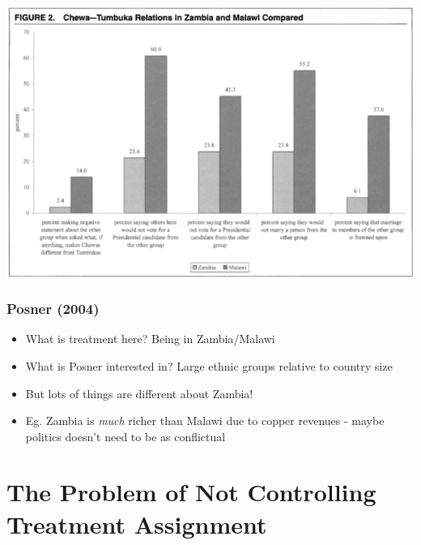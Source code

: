 \documentclass[xcolor=x11names,compress]{beamer}\usepackage[]{graphicx}\usepackage[]{color}
\renewcommand{\(}{\begin{columns}}
\renewcommand{\)}{\end{columns}}
\newcommand{\<}[1]{\begin{column}{#1}}
\renewcommand{\>}{\end{column}}
\begin{document}
\begin{frame}
\includegraphics[width=1\textwidth]{Posner_results.png}
\end{frame}

\begin{frame}
\frametitle{Posner (2004)}
\begin{itemize}
\item What is treatment here? \pause Being in Zambia/Malawi
\pause 
\item What is Posner interested in? \pause Large ethnic groups relative to country size
\pause
\item But lots of things are different about Zambia!
\pause
\item Eg. Zambia is \textit{much} richer than Malawi due to copper revenues - maybe politics doesn't need to be as conflictual
\end{itemize}
\end{frame}

\section{The Problem of Not Controlling Treatment Assignment}
\end{document}
